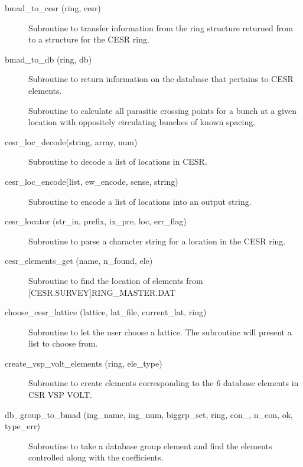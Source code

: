 \begin{description}

\item[bmad\_to\_cesr (ring, cesr)] \Newline
Subroutine to transfer information from the ring structure returned from 
 to a structure for the CESR ring.

\item[bmad\_to\_db (ring, db)] \Newline
Subroutine to return information on the database that pertains to CESR elements. 

\item[\protect\parbox{6in}{cesr\_crossings (i\_train, j\_car, species, n\_trains\_tot, 
\\ \hspace*{2in}n\_cars, cross\_positions, n\_car\_spacing, train\_spacing)}] \Newline
Subroutine to calculate all parasitic crossing points for a bunch at a given location 
with oppositely circulating bunches of known spacing. 

\item[cesr\_loc\_decode(string, array, num)] \Newline 
Subroutine to decode a list of locations in CESR.

\item[cesr\_loc\_encode(list, ew\_encode, sense, string)] \Newline 
Subroutine to encode a list of locations into an output string.

\item[cesr\_locator (str\_in, prefix, ix\_pre, loc, err\_flag)] \Newline 
Subroutine to parse a character string for a location in the CESR ring.

\item[cesr\_elements\_get (name, n\_found, ele)] \Newline 
Subroutine to find the location of elements from [CESR.SURVEY]RING\_MASTER.DAT

\item[choose\_cesr\_lattice (lattice, lat\_file, current\_lat, ring)] \Newline
Subroutine to let the user choose a lattice. The subroutine will present a list to choose from. 

\item[create\_vsp\_volt\_elements (ring, ele\_type)] \Newline
Subroutine to create elements corresponding to the 6 database elements in CSR VSP VOLT. 

\item[db\_group\_to\_bmad (ing\_name, ing\_num, biggrp\_set, 
ring, con\_, n\_con, ok, type\_err)] \Newline
Subroutine to take a database group element and find the elements 
controlled along with the coefficients. 


\end{description}
